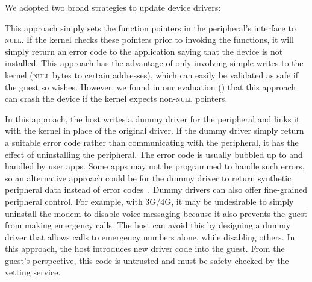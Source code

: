 We adopted two broad strategies to update device drivers:  

\begin{mylist} 
%
\item {} This
approach simply sets the function pointers in the peripheral's interface to
\textsc{null}. If the kernel checks these pointers prior to invoking the
functions, it will simply return an error code to the application saying that
the device is not installed. This approach has the advantage of only involving
simple writes to the kernel (\textsc{null} bytes to certain addresses), which
can easily be validated as safe if the guest so wishes. However, we found in
our evaluation () that this approach can crash the
device if the kernel expects non-\textsc{null} pointers.
%
\item {} In this approach,
the host writes a dummy driver for the peripheral and links it with the kernel
in place of the original driver. If the dummy driver simply return a suitable
error code rather than communicating with the peripheral, it has the effect of
uninstalling the peripheral. The error code is usually bubbled up to and
handled by user apps. Some apps may not be programmed to handle such errors, so
an alternative approach could be for the dummy driver to return synthetic
peripheral data instead of error codes~\cite{mockdroid:hotmobile10}. Dummy
drivers can also offer fine-grained peripheral control. For example, with
3G/4G, it may be undesirable to simply uninstall the modem to disable voice
messaging because it also prevents the guest from making emergency calls. The
host can avoid this by designing a dummy driver that allows calls to emergency
numbers alone, while disabling others. In this approach, the host introduces
new driver code into the guest. From the guest's perspective, this code is
untrusted and must be safety-checked by the vetting service.

\end{mylist}

